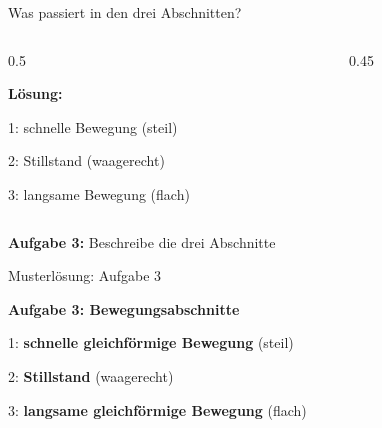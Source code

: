 \documentclass[aspectratio=169,11pt]{beamer}
\begin{document}
\begin{frame}{Was passiert in den drei Abschnitten?}
    \begin{columns}
        \begin{column}{0.5\textwidth}
            \textcolor{loesung}{\textbf{Lösung:}

            \vspace{0.5em}
            1: schnelle Bewegung (steil)

            \vspace{0.5em}
            2: Stillstand (waagerecht)

            \vspace{0.5em}
            3: langsame Bewegung (flach)}
        \end{column}
        \begin{column}{0.45\textwidth}
        \end{column}
    \end{columns}

    \vspace{0.3em}
    \begin{abhinweis}
        \textbf{Aufgabe 3:} Beschreibe die drei Abschnitte
    \end{abhinweis}
\end{frame}

\begin{frame}{Musterlösung: Aufgabe 3}
    \begin{center}
        \begin{mlbox}
            \textbf{Aufgabe 3: Bewegungsabschnitte}

            \vspace{0.5em}
            1: \textcolor{loesung}{\textbf{schnelle gleichförmige Bewegung}} (steil)

            \vspace{0.3em}
            2: \textcolor{loesung}{\textbf{Stillstand}} (waagerecht)

            \vspace{0.3em}
            3: \textcolor{loesung}{\textbf{langsame gleichförmige Bewegung}} (flach)
        \end{mlbox}
    \end{center}
\end{frame}
\end{document}
